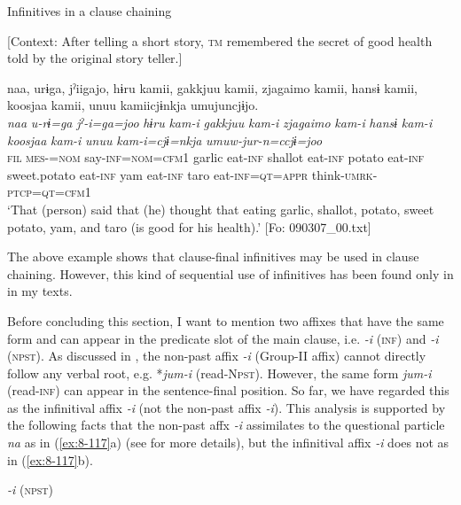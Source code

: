 \ea\label{ex:8-116}
  Infinitives in a clause chaining

  [Context: After telling a short story, \textsc{tm} remembered the secret of good health told by the original story teller.]

  {\TM}
\glll  naa,  urɨga,  jˀiigajo,  hɨru  kamii,  gakkjuu    kamii,  {\textbar}zjagaimo{\textbar}  kamii,  hansɨ  kamii,  koosjaa  kamii,    unuu  kamiicjɨnkja  umujuncjɨjo.\\
\textit{naa}  \textit{u-rɨ=ga}  \textit{jˀ-i=ga=joo}  \textit{hɨru}  \textit{kam-i}  \textit{gakkjuu}    \textit{kam-i}  \textit{zjagaimo}  \textit{kam-i}  \textit{hansɨ}  \textit{kam-i}  \textit{koosjaa}  \textit{kam-i}    \textit{unuu}  \textit{kam-i=cjɨ=nkja}  \textit{umuw-jur-n=ccjɨ=joo}\\
    \textsc{fil}  \textsc{mes}-=\textsc{nom}  say-\textsc{inf}=\textsc{nom}=\textsc{cfm1}  garlic  eat-\textsc{inf}  shallot  eat-\textsc{inf}  potato  eat-\textsc{inf}  sweet.potato  eat-\textsc{inf}  yam  eat-\textsc{inf}  taro  eat-\textsc{inf}=\textsc{qt}=\textsc{appr}  think-\textsc{umrk}-\textsc{ptcp}=\textsc{qt}=\textsc{cfm1}\\
\glt ‘That (person) said that (he) thought that eating garlic, shallot, potato, sweet potato, yam, and taro (is good for his health).’ [Fo: 090307\_00.txt]
\z

The above example shows that clause-final infinitives may be used in clause chaining. However, this kind of sequential use of infinitives has been found only in  in my texts.

Before concluding this section, I want to mention two affixes that have the same form and can appear in the predicate slot of the main clause, i.e. \textit{-i} (\textsc{inf}) and \textit{-i} (\textsc{npst}). As discussed in , the non-past affix \textit{-i} (Group-II affix) cannot directly follow any verbal root, e.g. *\textit{jum-i} (read-N\textsc{pst}). However, the same form \textit{jum-i} (read-\textsc{inf}) can appear in the sentence-final position. So far, we have regarded this as the infinitival affix \textit{-i} (not the non-past affix \textit{-i}). This analysis is supported by the following facts that the non-past affx \textit{-i} assimilates to the questional particle \textit{na} as in (\ref{ex:8-117}a) (see  for more details), but the infinitival affix \textit{-i} does not as in (\ref{ex:8-117}b).

\ea\label{ex:8-117}
\ea \textit{-i} (\textsc{npst})

